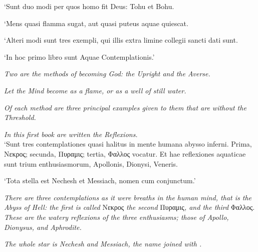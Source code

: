 {
\raggedbottom
{}

{

\begin{sloppypar}
`Sunt duo modi per quos homo fit Deus: Tohu et Bohu.

`Mens quasi flamma sugat, aut quasi puteus aquae quiescat.

`Alteri modi sunt tres exempli, qui illis extra limine collegii sancti dati sunt.

`In hoc primo libro sunt Aquae Contemplationis.'

\textit{Two are the methods of becoming God: the Upright and the Averse.}

\textit{Let the Mind become as a flame, or as a well of still water.}

\textit{Of each method are three principal examples given to them that are without the Threshold.}

\textit{In this first book are written the Reflexions.} \\

`Sunt tres contemplationes quasi halitus in mente humana abysso inferni. Prima, \textgreek{Νεκρος}; secunda, \textgreek{Πυραμις}; tertia, \textgreek{Φαλλος} vocatur. Et hae reflexiones aquaticae sunt trium enthusiasmorum, Apollonis, Dionysi, Veneris.

`Tota stella est Nechesh et Messiach, nomen  cum  conjunctum.'

\textit{There are three contemplations as it were breaths in the human mind, that is the Abyss of Hell: the first is called }\textgreek{Νεκρος}\textit{ the second }\textgreek{Πυραμις}\textit{, and the third }\textgreek{Φαλλος}.\textit{ These are the watery reflexions of the three enthusiasms; those of Apollo, Dionysus, and Aphrodite.}

\textit{The whole star is Nechesh and Messiach, the name  joined with .}
\end{sloppypar}

}
}

\pagebreak
{}




